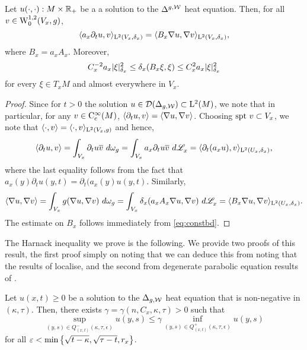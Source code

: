 \documentclass[a4paper, 12pt]{amsart}
\begin{document}
\begin{lemma}
\label{eq:soln1}
Let $u(\cdot, \cdot): M \times \R_+$  be a a solution to the $\Delta^{g,\cW}$ heat equation.
Then, for all $v \in \SobH[0]{1}(V_x,g)$, 
	\begin{equation} 
	\label{eq:testfn1}	 
	\inprod{a_x \partial_t u, v}_{\Lp{2}(V_x, \delta_x)} 
		= \inprod{ B_x \nabla u, \nabla v}_{\Lp{2}(V_x, \delta_x)},
	\end{equation}
where $B_x = a_x A_x$. Moreover,
\begin{equation}
\label{eq:coeff}
C_x^{-2} a_x \modulus{\xi}_{\delta_x}^2 \leq \delta_x(B_x \xi, \xi) 
	\leq C_x^2 a_x \modulus{\xi}_{\delta_x}^2
\end{equation} 
for every $\xi \in T_xM$ and almost everywhere in $V_x$. 
\end{lemma}
\begin{proof}
Since for $t > 0$ the solution $u \in \dom(\Delta_{g,\cW}) \subset \Lp{2}(M)$, we
note that in particular, for any $v \in \Ck[c]{\infty}(M)$, 
$\inprod{\partial_t u, v} = \inprod{\nabla u, \nabla v}$.
Choosing $\spt v \subset V_x$, we note that $\inprod{\cdot, v} = \inprod{\cdot, v}_{\Lp{2}(V_x,g)}$
and hence,
$$\inprod{\partial_t u, v} = \int_{V_x} \partial_t u\conj{v}\ d\omega_g 
	= \int_{V_x} a_x \partial_t  u \conj{v}\ d\Leb_x
	= \inprod{\partial_t (a_x u), v}_{\Lp{2}(U_x, \delta_x)},$$
where the last equality follows from the fact that 
$a_x(y) \partial_t u(y,t) = \partial_t (a_x(y)u(y,t).$
Similarly,
$$\inprod{\nabla u, \nabla v} 
	= \int_{V_x} g(\nabla u, \nabla v)\ d\omega_g
	= \int_{V_x} \delta_x(a_x A_x \nabla u, \nabla v)\ d\Leb_x
	= \inprod{B_x \nabla u, \nabla v}_{\Lp{2}(U_x, \delta_x)}.$$
The estimate on $B_x$ follows immediately from
\eqref{eq:constbd}.
\end{proof} 

The Harnack inequality we prove is the following. We provide two proofs of this result, 
the first proof simply on noting that we can deduce this from noting that the results
of \cite{SC} localise, and the second from degenerate parabolic equation results of \cite{CS}.

\begin{thm}
\label{thm:Harnack}
Let $u(x,t) \geq 0$ be a
solution to the $\Delta_{g,\cW}$ heat equation 
that is non-negative in $(\kappa, \tau)$. 
Then, there exists $\gamma = \gamma(n, C_x, \kappa, \tau) > 0$ such that 
$$ \sup_{(y,s) \in Q^-_{(x,t)}(\kappa, \tau,\epsilon)} u(y, s) 
	\leq \gamma \inf_{(y,s) \in Q^+_{(x,t)}(\kappa,\tau,\epsilon)} u(y,s)$$
for all $\epsilon < \min\set{ \sqrt{t - \kappa}, \sqrt{\tau - t}, r_x}$.
\end{thm}
\end{document}
